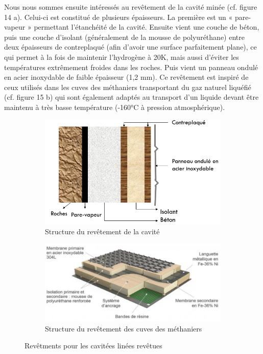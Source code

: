 \documentclass[11pt,french,a4paper]{article}
\begin{document}
Nous nous sommes ensuite intéressés au revêtement de la cavité minée (cf. figure 14 a). Celui-ci est constitué de plusieurs épaisseurs. La première est un « pare-vapeur » permettant l’étanchéité de la cavité. Ensuite vient une couche de béton, puis une couche d’isolant (généralement de la mousse de polyuréthane) entre deux épaisseurs de contreplaqué (afin d’avoir une surface parfaitement plane), ce qui permet à la fois de maintenir l’hydrogène à 20K, mais aussi d’éviter les températures extrêmement froides dans les roches. Puis vient un panneau ondulé en acier inoxydable de faible épaisseur (1,2 mm).
Ce revêtement est inspiré de ceux utilisés dans les cuves des méthaniers transportant du gaz naturel liquéfié (cf. figure 15 b) qui sont également adaptés au transport d’un liquide devant être maintenu à très basse température (-160°C à pression atmosphérique).\\

\begin{figure}[h!]
\centering
\begin{subfigure}[b]{0.4\linewidth}
\includegraphics[width=\linewidth]{image/chap2/Figure 3.ii.2-3.png}
\caption{Structure du revêtement de la cavité}
\end{subfigure}
\begin{subfigure}[b]{0.4\linewidth}
\includegraphics[width=\linewidth]{image/chap2/Figure 3.ii.2-4.png}
\caption{Structure du revêtement des cuves des méthaniers}
\end{subfigure}
\caption{Revêtments pour les cavitées linées revêtues}
\end{figure}
\end{document}
